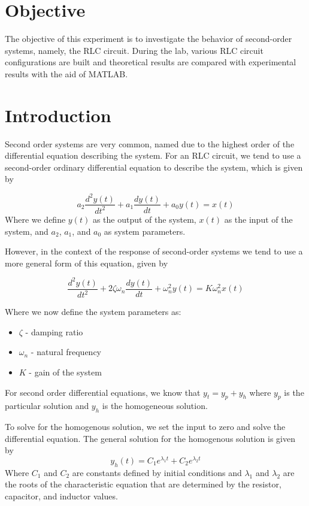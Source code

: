 \section{Objective}
The objective of this experiment is to investigate the behavior of second-order systems, namely, the RLC circuit. During the lab, various RLC circuit configurations are built and theoretical results are compared with experimental results with the aid of MATLAB.

\section{Introduction}
Second order systems are very common, named due to the highest order of the differential equation describing the system. For an RLC circuit, we tend to use a second-order ordinary differential equation to describe the system, which is given by

\begin{equation}
    a_2 \frac{d^2 y(t)}{dt^2} + a_1 \frac{dy(t)}{dt} + a_0 y(t) = x(t)
\end{equation}
Where we define $y(t)$ as the output of the system, $x(t)$ as the input of the system, and $a_2$, $a_1$, and $a_0$ as system parameters.

However, in the context of the response of second-order systems we tend to use a more general form of this equation, given by

\begin{equation}
    \frac{d^2 y(t)}{dt^2} + 2 \zeta \omega_n \frac{dy(t)}{dt} + \omega_n^2 y(t) = K \omega_n^2 x(t)
\end{equation}

Where we now define the system parameters as:

\begin{itemize}
    \item $\zeta$ - damping ratio
    \item $\omega_n$ - natural frequency
    \item $K$ - gain of the system
\end{itemize}

For second order differential equations, we know that $y_t = y_p + y_h$ where $y_p$ is the particular solution and $y_h$ is the homogeneous solution.

To solve for the homogenous solution, we set the input to zero and solve the differential equation. The general solution for the homogenous solution is given by
\begin{equation}
    y_h(t) = C_1 e^{\lambda_1 t} + C_2 e^{\lambda_2 t}
\end{equation}
Where $C_1$ and $C_2$ are constants defined by initial conditions and $\lambda_1$ and $\lambda_2$ are the roots of the characteristic equation that are determined by the resistor, capacitor, and inductor values.

